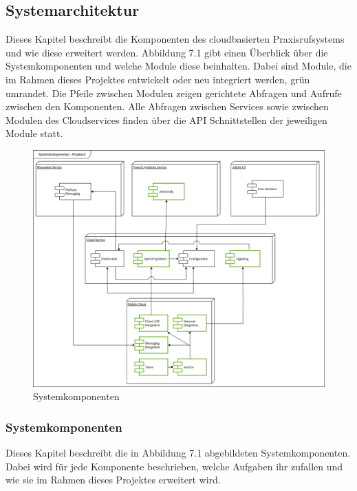 \subsection{Systemarchitektur}

Dieses Kapitel beschreibt die Komponenten des cloudbasierten Praxisrufsystems und wie diese erweitert werden.
Abbildung 7.1 gibt einen Überblick über die Systemkomponenten und welche Module diese beinhalten.
Dabei sind Module, die im Rahmen dieses Projektes entwickelt oder neu integriert werden, grün umrandet.
Die Pfeile zwischen Modulen zeigen gerichtete Abfragen und Aufrufe zwischen den Komponenten.
Alle Abfragen zwischen Services sowie zwischen Modulen des Cloudservices finden über die API Schnittstellen der jeweiligen Module statt.

\begin{figure}[h]
    \centering
    \begin{minipage}[b]{0.75\textwidth}
        \includegraphics[width=\textwidth]{graphics/diagramms/Component_System_V03}
        \caption{Systemkomponenten}
    \end{minipage}
\end{figure}

\subsubsection{Systemkomponenten}

Dieses Kapitel beschreibt die in Abbildung 7.1 abgebildeten Systemkomponenten.
Dabei wird für jede Komponente beschrieben, welche Aufgaben ihr zufallen und wie sie im Rahmen dieses Projektes erweitert wird.

